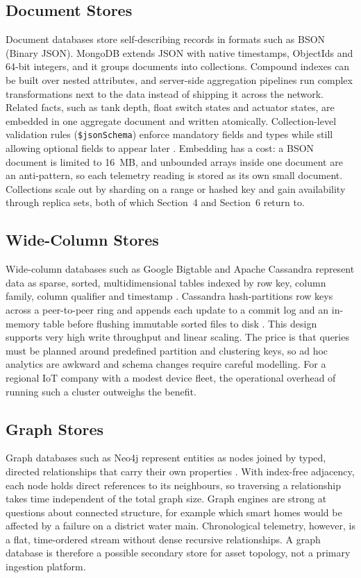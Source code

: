 \documentclass[11pt,a4paper]{article}
\begin{document}
\subsection{Document Stores}
Document databases store self-describing records in formats such as BSON (Binary JSON). MongoDB extends JSON with native timestamps, ObjectIds and 64-bit integers, and it groups documents into collections. Compound indexes can be built over nested attributes, and server-side aggregation pipelines run complex transformations next to the data instead of shipping it across the network. Related facts, such as tank depth, float switch states and actuator states, are embedded in one aggregate document and written atomically. Collection-level validation rules (\texttt{\$jsonSchema}) enforce mandatory fields and types while still allowing optional fields to appear later \citep{mongoVal}. Embedding has a cost: a BSON document is limited to 16~MB, and unbounded arrays inside one document are an anti-pattern, so each telemetry reading is stored as its own small document. Collections scale out by sharding on a range or hashed key and gain availability through replica sets, both of which Section~4 and Section~6 return to.

\subsection{Wide-Column Stores}
Wide-column databases such as Google Bigtable and Apache Cassandra represent data as sparse, sorted, multidimensional tables indexed by row key, column family, column qualifier and timestamp \citep{chang2008}. Cassandra hash-partitions row keys across a peer-to-peer ring and appends each update to a commit log and an in-memory table before flushing immutable sorted files to disk \citep{lakshman2010,oneil1996}. This design supports very high write throughput and linear scaling. The price is that queries must be planned around predefined partition and clustering keys, so ad hoc analytics are awkward and schema changes require careful modelling. For a regional IoT company with a modest device fleet, the operational overhead of running such a cluster outweighs the benefit.

\subsection{Graph Stores}
Graph databases such as Neo4j represent entities as nodes joined by typed, directed relationships that carry their own properties \citep{robinson2015}. With index-free adjacency, each node holds direct references to its neighbours, so traversing a relationship takes time independent of the total graph size. Graph engines are strong at questions about connected structure, for example which smart homes would be affected by a failure on a district water main. Chronological telemetry, however, is a flat, time-ordered stream without dense recursive relationships. A graph database is therefore a possible secondary store for asset topology, not a primary ingestion platform.
\end{document}
